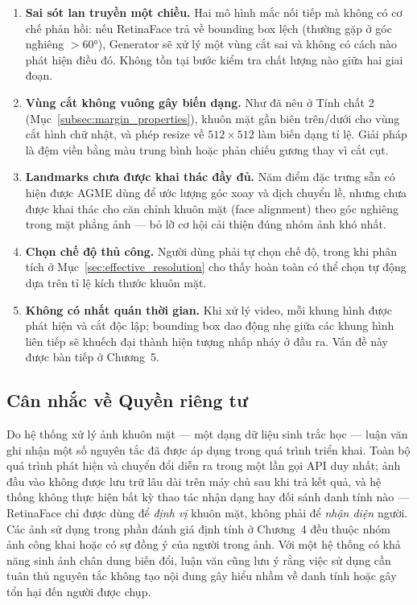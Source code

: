 \begin{enumerate}
    \item \textbf{Sai sót lan truyền một chiều.} Hai mô hình mắc nối tiếp mà không có cơ chế phản hồi: nếu RetinaFace trả về bounding box lệch (thường gặp ở góc nghiêng $> 60°$), Generator sẽ xử lý một vùng cắt sai và không có cách nào phát hiện điều đó. Không tồn tại bước kiểm tra chất lượng nào giữa hai giai đoạn.
    \item \textbf{Vùng cắt không vuông gây biến dạng.} Như đã nêu ở Tính chất 2 (Mục~\ref{subsec:margin_properties}), khuôn mặt gần biên trên/dưới cho vùng cắt hình chữ nhật, và phép resize về $512\times512$ làm biến dạng tỉ lệ. Giải pháp là đệm viền bằng màu trung bình hoặc phản chiếu gương thay vì cắt cụt.
    \item \textbf{Landmarks chưa được khai thác đầy đủ.} Năm điểm đặc trưng sẵn có hiện được AGME dùng để ước lượng góc xoay và dịch chuyển lề, nhưng chưa được khai thác cho căn chỉnh khuôn mặt (face alignment) theo góc nghiêng trong mặt phẳng ảnh --- bỏ lỡ cơ hội cải thiện đúng nhóm ảnh khó nhất.
    \item \textbf{Chọn chế độ thủ công.} Người dùng phải tự chọn chế độ, trong khi phân tích ở Mục~\ref{sec:effective_resolution} cho thấy hoàn toàn có thể chọn tự động dựa trên tỉ lệ kích thước khuôn mặt.
    \item \textbf{Không có nhất quán thời gian.} Khi xử lý video, mỗi khung hình được phát hiện và cắt độc lập; bounding box dao động nhẹ giữa các khung hình liên tiếp sẽ khuếch đại thành hiện tượng nhấp nháy ở đầu ra. Vấn đề này được bàn tiếp ở Chương~5.
\end{enumerate}

\subsection{Cân nhắc về Quyền riêng tư}
\label{subsec:privacy}

Do hệ thống xử lý ảnh khuôn mặt --- một dạng dữ liệu sinh trắc học --- luận văn ghi nhận một số nguyên tắc đã được áp dụng trong quá trình triển khai. Toàn bộ quá trình phát hiện và chuyển đổi diễn ra trong một lần gọi API duy nhất; ảnh đầu vào không được lưu trữ lâu dài trên máy chủ sau khi trả kết quả, và hệ thống không thực hiện bất kỳ thao tác nhận dạng hay đối sánh danh tính nào --- RetinaFace chỉ được dùng để \textit{định vị} khuôn mặt, không phải để \textit{nhận diện} người. Các ảnh sử dụng trong phần đánh giá định tính ở Chương~4 đều thuộc nhóm ảnh công khai hoặc có sự đồng ý của người trong ảnh. Với một hệ thống có khả năng sinh ảnh chân dung biến đổi, luận văn cũng lưu ý rằng việc sử dụng cần tuân thủ nguyên tắc không tạo nội dung gây hiểu nhầm về danh tính hoặc gây tổn hại đến người được chụp.

